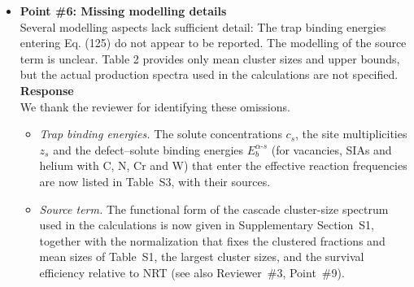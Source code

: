 \documentclass{article}
\begin{document}
\begin{itemize}
\textbf{Response}\\
We agree. The revised manuscript states the principal assumptions of mean-field cluster dynamics explicitly:
\begin{itemize}
    \item Section~2.4 (``Rate equations versus the chemical master equation'') explains that Eq.~(14) follows only after the mean-field closure $\langle N_bN_c\rangle\simeq\langle N_b\rangle\langle N_c\rangle$. It is therefore the large-population, well-mixed limit of the stochastic description rather than its exact first moment. The stochastic description is appropriate when populations are small or fluctuations control nucleation.
    \item The fixed-sink term $D_ac_a$ is identified as a mean-field closure (Supplementary Section~S2).
    \item The spatial correlation of cascade debris is not represented (Reviewer~\#3, Point~\#1).
    \item Class~III reactions are excluded, and the conditions under which this exclusion fails are given (Point~\#2).
    \item The one-way rotation closure and the calibrated barriers of the conversion channels are identified as mesoscale assumptions (Supplementary Section~S3, Class~V, and Table~S8).
    \item Section~4.1 now contains a paragraph stating what the comparison with experiment does not establish.
\end{itemize}

\item \textbf{Point \#6: Missing modelling details}\\
Several modelling aspects lack sufficient detail: The trap binding energies entering Eq. (125) do not appear to be reported. The modelling of the source term is unclear. Table 2 provides only mean cluster sizes and upper bounds, but the actual production spectra used in the calculations are not specified.\\

\textbf{Response}\\
We thank the reviewer for identifying these omissions.
\begin{itemize}
    \item \emph{Trap binding energies.} The solute concentrations $c_s$, the site multiplicities $z_s$ and the defect--solute binding energies $E_b^{\alpha\text{-}s}$ (for vacancies, SIAs and helium with C, N, Cr and W) that enter the effective reaction frequencies are now listed in Table~S3, with their sources.
    \item \emph{Source term.} The functional form of the cascade cluster-size spectrum used in the calculations is now given in Supplementary Section~S1, together with the normalization that fixes the clustered fractions and mean sizes of Table~S1, the largest cluster sizes, and the survival efficiency relative to NRT (see also Reviewer~\#3, Point~\#9).
\end{itemize}


\end{itemize}
\end{document}
